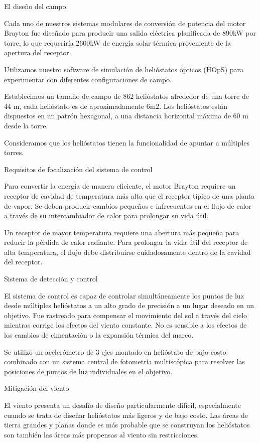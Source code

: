 \documentclass[12pt]{article}
\begin{document}
El diseño del campo.

Cada uno de nuestros sistemas modulares de conversión de potencia del motor Brayton fue diseñado para producir una salida eléctrica planificada de 890kW por torre, lo que requeriría 2600kW de energía solar térmica proveniente de la apertura del receptor.

Utilizamos nuestro software de simulación de helióstatos ópticos (HOpS) para experimentar con diferentes configuraciones de campo.

Establecimos un tamaño de campo de 862 helióstatos alrededor de una torre de 44 m, cada helióstato es de aproximadamente 6m2. Los helióstatos están dispuestos en un patrón hexagonal, a una distancia horizontal máxima de 60 m desde la torre.

Consideramos que los helióstatos tienen la funcionalidad de apuntar a múltiples torres.

Requisitos de focalización del sistema de control

Para convertir la energía de manera eficiente, el motor Brayton requiere un receptor de cavidad de temperatura más alta que el receptor típico de una planta de vapor. Se deben producir cambios pequeños e infrecuentes en el flujo de calor a través de su intercambiador de calor para prolongar su vida útil.

Un receptor de mayor temperatura requiere una abertura más pequeña para reducir la pérdida de calor radiante. Para prolongar la vida útil del receptor de alta temperatura, el flujo debe distribuirse cuidadosamente dentro de la cavidad del receptor.

Sistema de detección y control

El sistema de control es capaz de controlar simultáneamente los puntos de luz desde múltiples helióstatos a un alto grado de precisión a un lugar deseado en un objetivo. Fue rastreado para compensar el movimiento del sol a través del cielo mientras corrige los efectos del viento constante. No es sensible a los efectos de los cambios de cimentación o la expansión térmica del marco.

Se utilizó un acelerómetro de 3 ejes montado en helióstato de bajo costo combinado con un sistema central de fotometría multiscópica para resolver las posiciones de puntos de luz individuales en el objetivo.

Mitigación del viento

El viento presenta un desafío de diseño particularmente difícil, especialmente cuando se trata de diseñar helióstatos más ligeros y de bajo costo. Las áreas de tierra grandes y planas donde es más probable que se construyan los helióstatos son también las áreas más propensas al viento sin restricciones.
\end{document}
